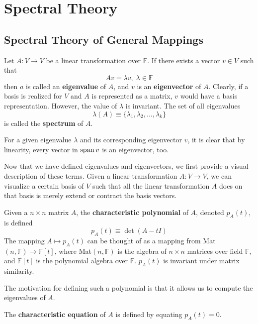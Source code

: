 \section{Spectral Theory} 

\subsection{Spectral Theory of General Mappings}

  \begin{definition}
  Let $A: V \longrightarrow V$ be a linear transformation over $\mathbb{F}$. If there exists a vector $v \in V$ such that
  \[ A v = \lambda v, \; \lambda \in \mathbb{F}\]
  then $a$ is called an \textbf{eigenvalue} of $A$, and $v$ is an \textbf{eigenvector} of $A$. Clearly, if a basis is realized for $V$ and $A$ is represented as a matrix, $v$ would have a basis representation. However, the value of $\lambda$ is invariant. The set of all eigenvalues 
  \[\lambda(A) \equiv \{ \lambda_1, \lambda_2, ..., \lambda_k\}\]
  is called the \textbf{spectrum} of $A$. 
  \end{definition}

  For a given eigenvalue $\lambda$ and its corresponding eigenvector $v$, it is clear that by linearity, every vector in $\Span v$ is an eigenvector, too. 

  Now that we have defined eigenvalues and eigenvectors, we first provide a visual description of these terms. Given a linear transformation $A: V \longrightarrow V$, we can visualize a certain basis of $V$ such that all the linear transformation $A$ does on that basis is merely extend or contract the basis vectors.

  \begin{definition}
  Given a $n \times n$ matrix $A$, the \textbf{characteristic polynomial} of $A$, denoted $p_A (t)$, is defined
  \[ p_A (t) \equiv \det{(A - t I)}\]
  The mapping $A \mapsto p_A (t)$ can be thought of as a mapping from Mat$(n, \mathbb{F}) \longrightarrow \mathbb{F}[t]$, where Mat$(n, \mathbb{F})$ is the algebra of $n \times n$ matrices over field $\mathbb{F}$, and $\mathbb{F}[t]$ is the polynomial algebra over $\mathbb{F}$. $p_A (t)$ is invariant under matrix similarity. 
  \end{definition}

  The motivation for defining such a polynomial is that it allows us to compute the eigenvalues of $A$. 
  \begin{definition}
  The \textbf{characteristic equation} of $A$ is defined by equating $p_A (t) = 0$. 
  \end{definition}


